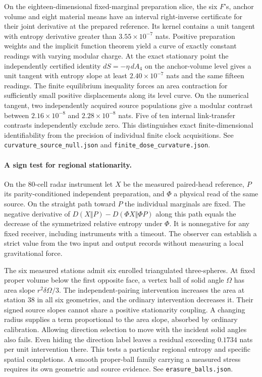 \documentclass[11pt]{article}
\begin{document}
On the eighteen-dimensional fixed-marginal preparation slice, the
six \(F\)'s, anchor volume and eight material means have an interval
right-inverse certificate for their joint derivative at the prepared
reference. Its kernel contains a unit tangent with entropy derivative
greater than \(3.55\times10^{-7}\) nats. Positive preparation weights
and the implicit function theorem yield a curve of exactly constant
readings with varying modular charge. At the exact stationary
point the independently certified identity \(dS=-\eta\,dA_4\)
on the anchor-volume level gives a unit tangent with entropy slope
at least \(2.40\times10^{-7}\) nats and the same fifteen readings.
The finite equilibrium inequality forces an area contraction for
sufficiently small positive displacements along its level curve.
On the numerical tangent, two independently acquired source
populations give a modular contrast between \(2.16\times10^{-8}\)
and \(2.28\times10^{-8}\) nats. Five of ten internal link-transfer
contrasts independently exclude zero. This distinguishes
exact finite-dimensional identifiability from the precision of
individual finite clock acquisitions. See
\texttt{curvature\_source\_null.json} and
\texttt{finite\_dose\_curvature.json}.

\paragraph{A sign test for regional stationarity.}
On the 80-cell radar instrument let \(X\) be the measured paired-head
reference, \(P\) its parity-conditioned independent preparation, and
\(\Phi\) a physical read of the same source. On the straight path
toward \(P\) the individual marginals are fixed. The negative
derivative of \(D(X\Vert P)-D(\Phi X\Vert\Phi P)\) along this path
equals the decrease of the symmetrized relative entropy under
\(\Phi\). It is nonnegative for any fixed receiver, including
instruments with a timeout. The observer can establish a strict
value from the two input and output records without measuring
a local gravitational force.

The six measured stations admit six enrolled triangulated
three-spheres. At fixed proper volume below the first opposite face,
a vertex ball of solid angle \(\Omega\) has area slope
\(r^2\delta\Omega/3\). The independent-pairing intervention increases
the area at station 38 in all six geometries, and the ordinary
intervention decreases it. Their signed source slopes cannot share
a positive stationarity coupling. A changing radius supplies a term
proportional to the area slope, absorbed by ordinary calibration.
Allowing direction selection to move with the incident solid angles
also fails. Even hiding the direction label leaves a residual
exceeding \(0.1734\) nats per unit intervention there. This tests a
particular regional entropy and specific spatial completions. A
smooth proper-ball family carrying a measured stress requires its
own geometric and source evidence. See
\texttt{erasure\_balls.json}.
\end{document}
